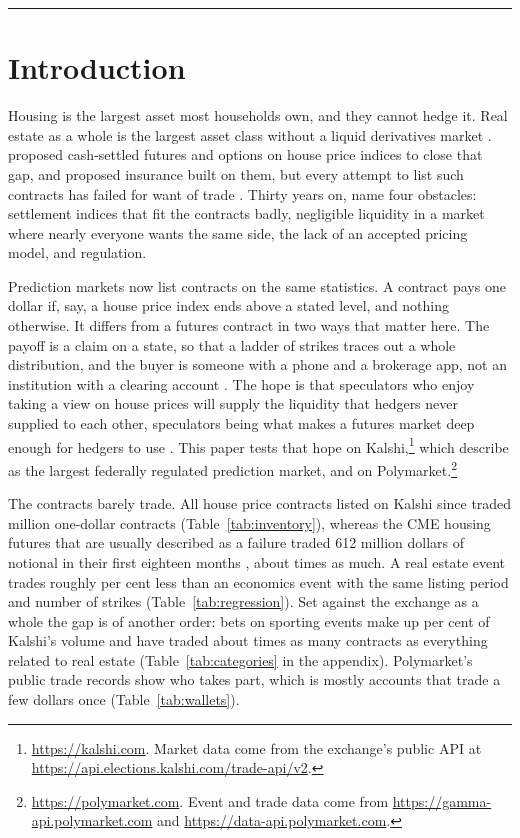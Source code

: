 \documentclass[12pt,a4paper]{article}
\begin{document}
\noindent\rule{\textwidth}{0.4pt}

\newpage
\onehalfspacing

\section{Introduction}

Housing is the largest asset most households own, and they cannot hedge it. Real estate as a whole is the largest asset class without a liquid derivatives market \citep{geltner2007pricing,fabozzi2020thirty}. \citet{case1993index} proposed cash-settled futures and options on house price indices to close that gap, and \citet{shiller1999home} proposed insurance built on them, but every attempt to list such contracts has failed for want of trade \citep{shiller2008derivatives}. Thirty years on, \citet{fabozzi2020thirty} name four obstacles: settlement indices that fit the contracts badly, negligible liquidity in a market where nearly everyone wants the same side, the lack of an accepted pricing model, and regulation.

Prediction markets now list contracts on the same statistics. A contract pays one dollar if, say, a house price index ends above a stated level, and nothing otherwise. It differs from a futures contract in two ways that matter here. The payoff is a claim on a state, so that a ladder of strikes traces out a whole distribution, and the buyer is someone with a phone and a brokerage app, not an institution with a clearing account \citep{diercks2026kalshi}. The hope is that speculators who enjoy taking a view on house prices will supply the liquidity that hedgers never supplied to each other, speculators being what makes a futures market deep enough for hedgers to use \citep{pagano1989trading}. This paper tests that hope on Kalshi,\footnote{\url{https://kalshi.com}. Market data come from the exchange's public API at \url{https://api.elections.kalshi.com/trade-api/v2}.} which \citet{diercks2026kalshi} describe as the largest federally regulated prediction market, and on Polymarket.\footnote{\url{https://polymarket.com}. Event and trade data come from \url{https://gamma-api.polymarket.com} and \url{https://data-api.polymarket.com}.}

The contracts barely trade. All house price contracts listed on Kalshi since \firstOpen{} traded \priceVolM{} million one-dollar contracts (Table~\ref{tab:inventory}), whereas the CME housing futures that are usually described as a failure traded 612 million dollars of notional in their first eighteen months \citep{shiller2008derivatives}, about \cmeRatio{} times as much. A real estate event trades roughly \condGap{} per cent less than an economics event with the same listing period and number of strikes (Table~\ref{tab:regression}). Set against the exchange as a whole the gap is of another order: bets on sporting events make up \sportsShare{} per cent of Kalshi's volume and have traded about \sportsToRe{} times as many contracts as everything related to real estate (Table~\ref{tab:categories} in the appendix). Polymarket's public trade records show who takes part, which is mostly accounts that trade a few dollars once (Table~\ref{tab:wallets}).
\end{document}
